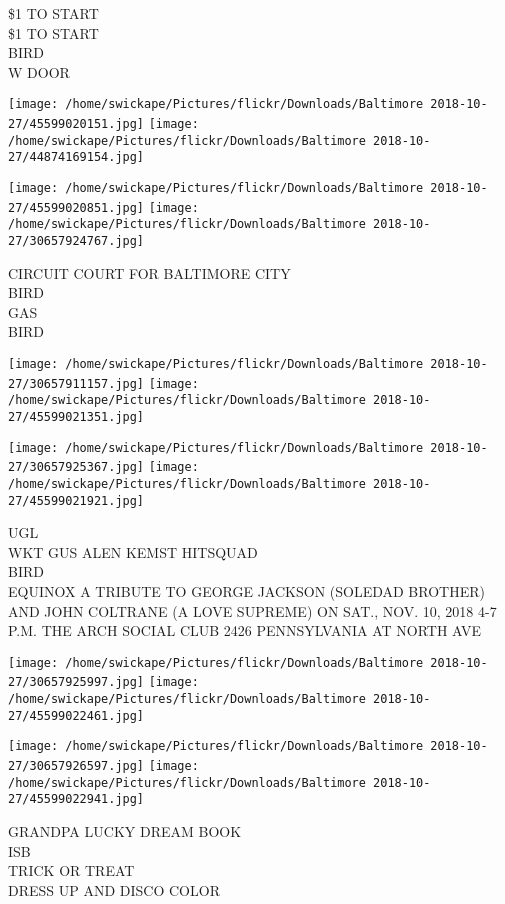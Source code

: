 \documentclass[10pt,letterpaper]{article}
\begin{document}
\$1 TO START\\
\$1 TO START\\
BIRD\\
W DOOR
\pagebreak

\texttt{[image: /home/swickape/Pictures/flickr/Downloads/Baltimore 2018-10-27/45599020151.jpg]}
\texttt{[image: /home/swickape/Pictures/flickr/Downloads/Baltimore 2018-10-27/44874169154.jpg]}

\texttt{[image: /home/swickape/Pictures/flickr/Downloads/Baltimore 2018-10-27/45599020851.jpg]}
\texttt{[image: /home/swickape/Pictures/flickr/Downloads/Baltimore 2018-10-27/30657924767.jpg]}

CIRCUIT COURT FOR BALTIMORE CITY\\
BIRD\\
GAS\\
BIRD
\pagebreak

\texttt{[image: /home/swickape/Pictures/flickr/Downloads/Baltimore 2018-10-27/30657911157.jpg]}
\texttt{[image: /home/swickape/Pictures/flickr/Downloads/Baltimore 2018-10-27/45599021351.jpg]}

\texttt{[image: /home/swickape/Pictures/flickr/Downloads/Baltimore 2018-10-27/30657925367.jpg]}
\texttt{[image: /home/swickape/Pictures/flickr/Downloads/Baltimore 2018-10-27/45599021921.jpg]}

UGL\\
WKT GUS ALEN KEMST HITSQUAD\\
BIRD\\
EQUINOX A TRIBUTE TO GEORGE JACKSON (SOLEDAD BROTHER) AND JOHN COLTRANE (A LOVE SUPREME) ON SAT., NOV. 10, 2018 4{-}7 P.M. THE ARCH SOCIAL CLUB 2426 PENNSYLVANIA AT NORTH AVE
\pagebreak

\texttt{[image: /home/swickape/Pictures/flickr/Downloads/Baltimore 2018-10-27/30657925997.jpg]}
\texttt{[image: /home/swickape/Pictures/flickr/Downloads/Baltimore 2018-10-27/45599022461.jpg]}

\texttt{[image: /home/swickape/Pictures/flickr/Downloads/Baltimore 2018-10-27/30657926597.jpg]}
\texttt{[image: /home/swickape/Pictures/flickr/Downloads/Baltimore 2018-10-27/45599022941.jpg]}

GRANDPA LUCKY DREAM BOOK\\
ISB\\
TRICK OR TREAT\\
DRESS UP AND DISCO COLOR
\pagebreak
\end{document}
